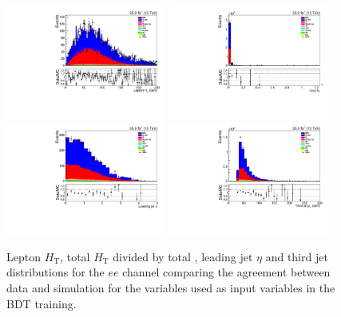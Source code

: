 \begin{figure}[htb]
\centering
\includegraphics[width=0.47\textwidth]{figs/background-estimation/plots/unblinded/prompt_ee_ttbarInc/lepHt_NPL_ee_wMass_ee.pdf}
\includegraphics[width=0.47\textwidth]{figs/background-estimation/plots/unblinded/prompt_ee_ttbarInc/totHtOverPt_NPL_ee_wMass_ee.pdf}
\\
\includegraphics[width=0.47\textwidth]{figs/background-estimation/plots/unblinded/prompt_ee_ttbarInc/leadingJetEta_NPL_ee_wMass_ee.pdf}
\includegraphics[width=0.47\textwidth]{figs/background-estimation/plots/unblinded/prompt_ee_ttbarInc/thirdJetPt_NPL_ee_wMass_ee.pdf}
\caption{
Lepton ${\ensuremath{H_{\mathrm{T}}}}$, total ${\ensuremath{H_{\mathrm{T}}}}$ divided by total \pt, leading jet $\eta$ and third jet \pT distributions for the $ee$ channel comparing the agreement between data and simulation for the variables used as input variables in the BDT training.}
\label{fig:inputFeaturesDataSimAgreement3}
\end{figure}

